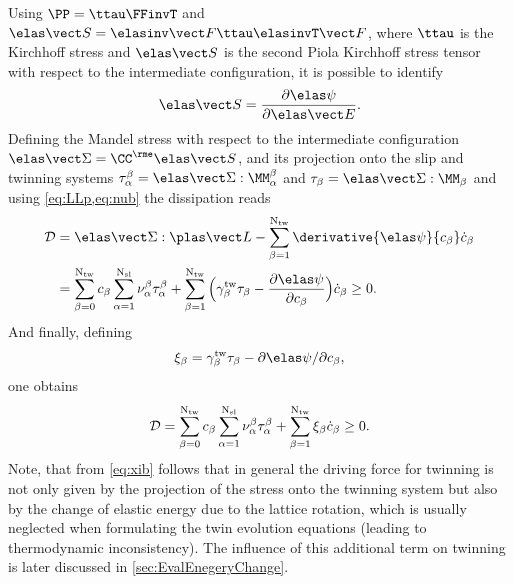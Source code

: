   Using $\PP = \ttau \FFinvT$ and $\SSe = \FFeinv \ttau \FFeinvT$, where $\ttau$ is the Kirchhoff stress and $\SSe$ is the second Piola Kirchhoff stress tensor with respect to the intermediate configuration, it is possible to identify
  \begin{equation}
    \SSe = \dpsieDEe.
    \label{eq:SSe}
  \end{equation}
  Defining the Mandel stress with respect to the intermediate configuration $\SSigmae=\CCe\SSe$, and its projection onto the slip and twinning systems $\tauab=\SSigmae:\MMab$ and $\taub = \SSigmae:\MMb$ and using \cref{eq:LLp,eq:nub} the dissipation reads
  \begin{equation}
      \begin{split}
      \diss &= \SSigmae : \LLp -\sumbNtw \derivative{\psie}{\cb}\cbdot \\
      &= \sumbONtw \cb \sumaNsl \nuab \tauab  + \sumbNtw \Big( \angleTwb \taub - \dpsieDcb \Big) \cbdot \geq 0.
      \end{split}
  \end{equation}
  And finally, defining 
  \begin{equation}
    \xib = \gammatwb\taub-\partial\psie/\partial\cb,
    \label{eq:xib}
  \end{equation}
  one obtains
  \begin{equation}
      \mathcal{D} = \sum_{\beta=0}^{{\rm N_{tw}}} c_{\beta} \sum_{\alpha=1}^{{\rm N_{sl}}} \nu_{\alpha}^{\beta} \tau_{\alpha}^{\beta} + \sum_{\beta=1}^{{\rm N_{tw}}} \xi_\beta \dot{c}_{\beta} \geq 0.
      \label{eq:redDiss}
  \end{equation}
  Note, that from \cref{eq:xib} follows that in general the driving force for twinning is not only given by the projection of the stress onto the twinning system but also by the change of elastic energy due to the lattice rotation, which is usually neglected when formulating the twin evolution equations (leading to thermodynamic inconsistency). The influence of this additional term on twinning is later discussed in \cref{sec:EvalEnegeryChange}.

